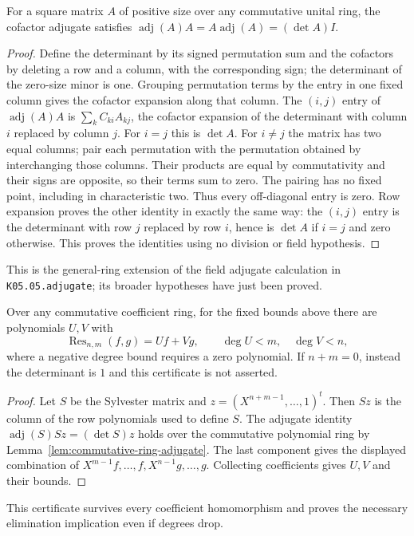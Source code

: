 \begin{lemma}\label{lem:commutative-ring-adjugate}
For a square matrix $A$ of positive size over any commutative unital
ring, the cofactor adjugate satisfies
$\operatorname{adj}(A)A=A\operatorname{adj}(A)=(\det A)I$.
\end{lemma}
\begin{proof}
Define the determinant by its signed permutation sum and the
cofactors by deleting a row and a column, with the corresponding sign;
the determinant of the zero-size minor is one.
Grouping permutation terms by the entry in one fixed column gives
the cofactor expansion along that column. The $(i,j)$ entry of
$\operatorname{adj}(A)A$ is
$\sum_k C_{ki}A_{kj}$, the cofactor expansion of the determinant
with column $i$ replaced by column $j$. For $i=j$ this is $\det A$.
For $i\ne j$ the matrix has two equal columns; pair each permutation
with the permutation obtained by interchanging those columns.
Their products are equal by commutativity and their signs are
opposite, so their terms sum to zero. The pairing has no fixed point,
including in characteristic two. Thus every off-diagonal entry is
zero. Row expansion proves the other identity in exactly the same
way: the $(i,j)$ entry is the determinant with row $j$ replaced by
row $i$, hence is $\det A$ if $i=j$ and zero otherwise.
This proves the identities using no division or field hypothesis.
\end{proof}
This is the general-ring extension of the field adjugate calculation
in \texttt{K05.05.adjugate}; its broader hypotheses have just been proved.
\begin{proposition}\label{prop:resultant-bezout}
Over any commutative coefficient ring, for the fixed bounds above
there are polynomials $U,V$ with
\[
 \operatorname{Res}_{n,m}(f,g)=Uf+Vg,\qquad
 \deg U<m,\quad \deg V<n,
\]
where a negative degree bound requires a zero polynomial.
If $n+m=0$, instead the determinant is $1$ and this certificate
is not asserted.
\end{proposition}
\begin{proof}
Let $S$ be the Sylvester matrix and
$z=(X^{n+m-1},\ldots,1)^t$. Then $Sz$ is the column of the row
polynomials used to define $S$. The adjugate identity
$\operatorname{adj}(S)Sz=(\det S)z$ holds over the commutative
polynomial ring by Lemma~\ref{lem:commutative-ring-adjugate}.
The last component gives the displayed
combination of $X^{m-1}f,\ldots,f,X^{n-1}g,\ldots,g$.
Collecting coefficients gives $U,V$ and their bounds.
\end{proof}
This certificate survives every coefficient homomorphism and
proves the necessary elimination implication even if degrees drop.

